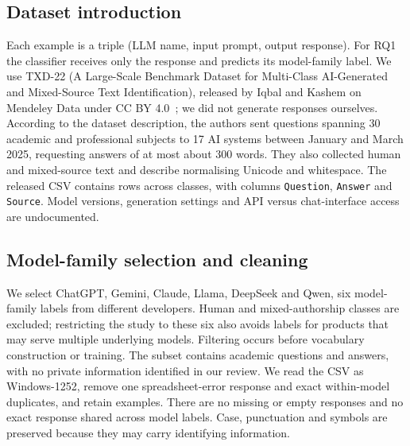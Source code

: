 \documentclass[11pt]{article}
\begin{document}
\subsection{Dataset introduction}
Each example is a triple (LLM name, input prompt, output response). For RQ1 the classifier receives only the
response and predicts its model-family label. We use TXD-22 (A Large-Scale Benchmark Dataset for Multi-Class AI-Generated and Mixed-Source
Text Identification), released by Iqbal and Kashem on Mendeley Data
under CC BY 4.0~\cite{txd22}; we did not generate responses ourselves. According to the dataset description,
the authors sent questions spanning 30 academic and professional subjects to 17 AI systems between January
and March 2025, requesting answers of at most about 300 words. They also collected human and mixed-source
text and describe normalising Unicode and whitespace. The released CSV contains \RawRows{} rows across
\RawClasses{} classes, with columns \texttt{Question}, \texttt{Answer} and \texttt{Source}. Model versions,
generation settings and API versus chat-interface access are undocumented.

\subsection{Model-family selection and cleaning}
We select ChatGPT, Gemini, Claude, Llama, DeepSeek and Qwen, six model-family labels from different developers.
Human and mixed-authorship classes are excluded; restricting the study to these six also avoids labels for
products that may serve multiple underlying models. Filtering occurs before vocabulary construction or
training. The subset contains academic questions and answers, with no private information identified in
our review. We read the CSV as Windows-1252, remove one spreadsheet-error response and
\RemovedDupResponses{} exact within-model duplicates, and retain \SubsetRows{} examples. There are no
missing or empty responses and no exact response shared across model labels. Case, punctuation and symbols
are preserved because they may carry identifying information.

\begin{table}[!htb]
\centering\small
\caption{Dataset after filtering and cleaning. Words and tokens are mean counts per response; median and
P99 refer to token counts. The classes remain approximately balanced.}
\label{tab:dataset}

\end{table}
\end{document}
